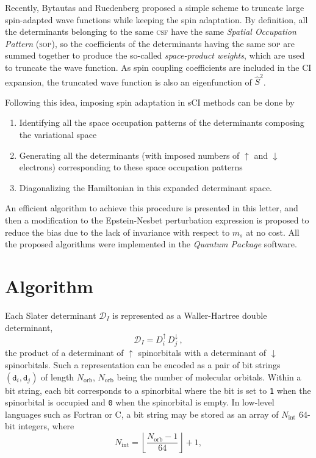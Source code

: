 \documentclass[aip,jcp,reprint,showkeys]{revtex4-1}
\newcommand{\stwo}{\hat{S}^2}
\newcommand{\md}{\mathtt{d}}
\newcommand{\mD}{\mathcal{D}}
\newcommand{\up}{\uparrow}
\newcommand{\dn}{\downarrow}
\newcommand{\Nint}{{N_\text{int}}}
\newcommand{\Norb}{{N_\text{orb}}}
\newcommand{\one}{{\texttt{1}}}
\newcommand{\zero}{{\texttt{0}}}
\newcommand{\sop}{\textsc{sop}}
\newcommand{\csf}{\textsc{csf}}
\begin{document}
Recently, Bytautas and Ruedenberg proposed a simple scheme to truncate large
spin-adapted wave functions while keeping the spin adaptation.\cite{Bytautas_2007}
By definition, all the determinants belonging to the same {\csf} have the same
\emph{Spatial Occupation Pattern} (\sop), so the
coefficients of the determinants having the same {\sop}
are summed together to produce the so-called \emph{space-product
weights}, which are used to truncate the wave function. As spin coupling
coefficients are included in the CI expansion, the truncated wave function is
also an eigenfunction of $\stwo$.

Following this idea, imposing spin adaptation in sCI methods can be done by 
\begin{enumerate}
\item Identifying all the space occupation patterns of the determinants composing
      the variational space
\item Generating all the determinants (with imposed numbers of $\up$ and
      $\dn$ electrons) corresponding to these space occupation patterns
\item Diagonalizing the Hamiltonian in this expanded determinant space.
\end{enumerate}
An efficient algorithm to achieve this procedure is presented in this letter,
and then a modification to the Epstein-Nesbet perturbation expression is
proposed to reduce the bias due to the lack of invariance with respect to 
$m_s$ at no cost.  All the proposed algorithms were implemented in the
\emph{Quantum Package} software.\cite{qp}


\section{Algorithm}

Each Slater determinant $\mD_I$ is represented as a Waller-Hartree double
determinant,\cite{Pauncz_1989}
\begin{equation}
 \label{eq:di}
 \mD_I = D_i^\up \, D_j^\dn\, ,
\end{equation}
the product of a determinant of
$\up$ spinorbitals with a determinant of $\dn$ spinorbitals.
Such a representation can be encoded as a pair of bit strings $(\md_i,\md_j)$ of length $\Norb$,  $\Norb$ being the number of molecular orbitals.
Within a bit string, each bit corresponds to a spinorbital where the bit is set to \one{} when the
spinorbital is occupied and \zero{} when the spinorbital is empty. In low-level languages such as Fortran or C, a bit
string may be stored as an array of $\Nint$ 64-bit integers, where 
\begin{equation}
  \Nint = \left \lfloor \frac{\Norb-1}{64} \right \rfloor + 1,
\end{equation}
\end{document}
